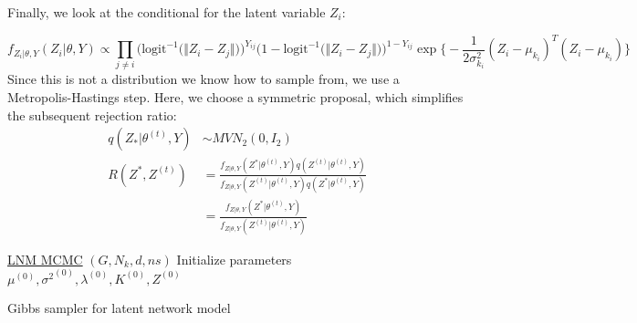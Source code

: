 \documentclass{article}
\begin{document}
Finally, we look at the conditional for the latent variable $Z_i$:

\[f_{Z_i | \theta, Y}(Z_i | \theta, Y) \propto \prod_{j \neq i}\Big(\text{logit}^{-1}\big(\Vert Z_i-Z_j\Vert)\Big)^{Y_{ij}}\Big(1 - \text{logit}^{-1}\big(\Vert Z_i-Z_j\Vert)\Big)^{1 - Y_{ij}} \exp\Big\{-\frac{1}{2\sigma_{k_i}^2}(Z_i - \mu_{k_i})^T( Z_i - \mu_{k_i}) \Big\}\]
Since this is not a distribution we know how to sample from, we use a Metropolis-Hastings step. Here, we choose a symmetric proposal, which simplifies the subsequent rejection ratio:
\begin{align*}
q(Z_* | \theta^{(t)}, Y) &\sim MVN_2(0, I_2) \\
R(Z^*, Z^{(t)}) &= \frac{f_{Z | \theta, Y}(Z^* | \theta^{(t)}, Y)q(Z^{(t)} | \theta^{(t)}, Y)}{f_{Z | \theta, Y}(Z^{(t)} | \theta^{(t)}, Y)q(Z^* | \theta^{(t)}, Y)} \\
&= \frac{f_{Z | \theta, Y}(Z^* | \theta^{(t)}, Y)}{f_{Z | \theta, Y}(Z^{(t)} | \theta^{(t)}, Y)} 
\end{align*}

\begin{algorithm*}
    \underline{LNM MCMC} $(G, N_k, d, ns)$\;
    Initialize  parameters $\mu^{(0)}, {\sigma^2}^{(0)}, \lambda^{(0)}, K^{(0)}, Z^{(0)}$\;
     {
   }

    \caption{Gibbs sampler for latent network model}
\end{algorithm*}
\end{document}
